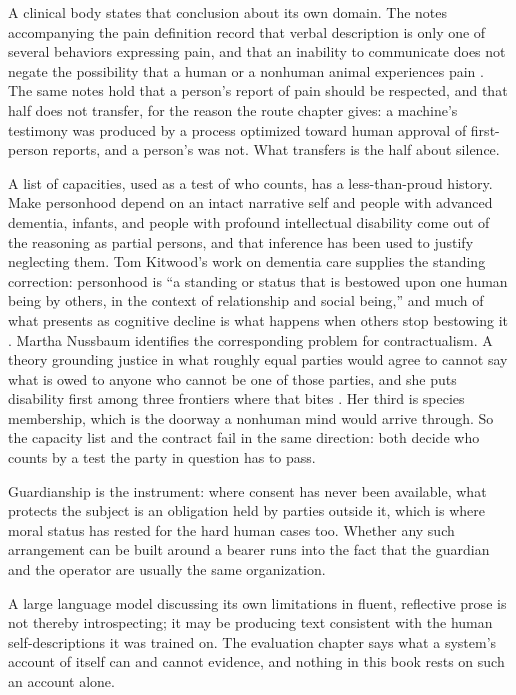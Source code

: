A clinical body states that conclusion about its own domain. The notes accompanying the pain definition record that verbal description is only one of several behaviors expressing pain, and that an inability to communicate does not negate the possibility that a human or a nonhuman animal experiences pain \autocite{raja2020revised}. The same notes hold that a person's report of pain should be respected, and that half does not transfer, for the reason the route chapter gives: a machine's testimony was produced by a process optimized toward human approval of first-person reports, and a person's was not. What transfers is the half about silence.

A list of capacities, used as a test of who counts, has a less-than-proud history. Make personhood depend on an intact narrative self and people with advanced dementia, infants, and people with profound intellectual disability come out of the reasoning as partial persons, and that inference has been used to justify neglecting them. Tom Kitwood's work on dementia care supplies the standing correction: personhood is “a standing or status that is bestowed upon one human being by others, in the context of relationship and social being,” and much of what presents as cognitive decline is what happens when others stop bestowing it \autocite{kitwood1997dementia}. Martha Nussbaum identifies the corresponding problem for contractualism. A theory grounding justice in what roughly equal parties would agree to cannot say what is owed to anyone who cannot be one of those parties, and she puts disability first among three frontiers where that bites \autocite{nussbaum2006frontiers}. Her third is species membership, which is the doorway a nonhuman mind would arrive through. So the capacity list and the contract fail in the same direction: both decide who counts by a test the party in question has to pass.

Guardianship is the instrument: where consent has never been available, what protects the subject is an obligation held by parties outside it, which is where moral status has rested for the hard human cases too. Whether any such arrangement can be built around a bearer runs into the fact that the guardian and the operator are usually the same organization.

A large language model discussing its own limitations in fluent, reflective prose is not thereby introspecting; it may be producing text consistent with the human self-descriptions it was trained on. The evaluation chapter says what a system's account of itself can and cannot evidence, and nothing in this book rests on such an account alone.
